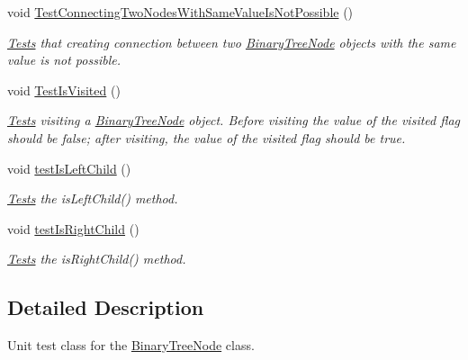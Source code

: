 \begin{DoxyCompactItemize}
void \hyperlink{class_binary_tree_amortized_analyis_1_1_tests_1_1_binary_tree_node_tests_ac97c78005d18135f15b6e1dc1d231073}{Test\+Connecting\+Two\+Nodes\+With\+Same\+Value\+Is\+Not\+Possible} ()
\begin{DoxyCompactList}\small\item\em \hyperlink{namespace_binary_tree_amortized_analyis_1_1_tests}{Tests} that creating connection between two \hyperlink{class_binary_tree_amortized_analyis_1_1_binary_tree_node}{Binary\+Tree\+Node} objects with the same value is not possible. \end{DoxyCompactList}\item 
void \hyperlink{class_binary_tree_amortized_analyis_1_1_tests_1_1_binary_tree_node_tests_a8df3ce5b9bf41cc71598f08a490c1c4e}{Test\+Is\+Visited} ()
\begin{DoxyCompactList}\small\item\em \hyperlink{namespace_binary_tree_amortized_analyis_1_1_tests}{Tests} visiting a \hyperlink{class_binary_tree_amortized_analyis_1_1_binary_tree_node}{Binary\+Tree\+Node} object. Before visiting the value of the visited flag should be false; after visiting, the value of the visited flag should be true. \end{DoxyCompactList}\item 
void \hyperlink{class_binary_tree_amortized_analyis_1_1_tests_1_1_binary_tree_node_tests_a0191c1bb6893a784d4fe6ccad459e071}{test\+Is\+Left\+Child} ()
\begin{DoxyCompactList}\small\item\em \hyperlink{namespace_binary_tree_amortized_analyis_1_1_tests}{Tests} the is\+Left\+Child() method. \end{DoxyCompactList}\item 
void \hyperlink{class_binary_tree_amortized_analyis_1_1_tests_1_1_binary_tree_node_tests_a682cf8370396e657a449732284ecd6e2}{test\+Is\+Right\+Child} ()
\begin{DoxyCompactList}\small\item\em \hyperlink{namespace_binary_tree_amortized_analyis_1_1_tests}{Tests} the is\+Right\+Child() method. \end{DoxyCompactList}\end{DoxyCompactItemize}


\subsection{Detailed Description}
Unit test class for the \hyperlink{class_binary_tree_amortized_analyis_1_1_binary_tree_node}{Binary\+Tree\+Node} class. 



